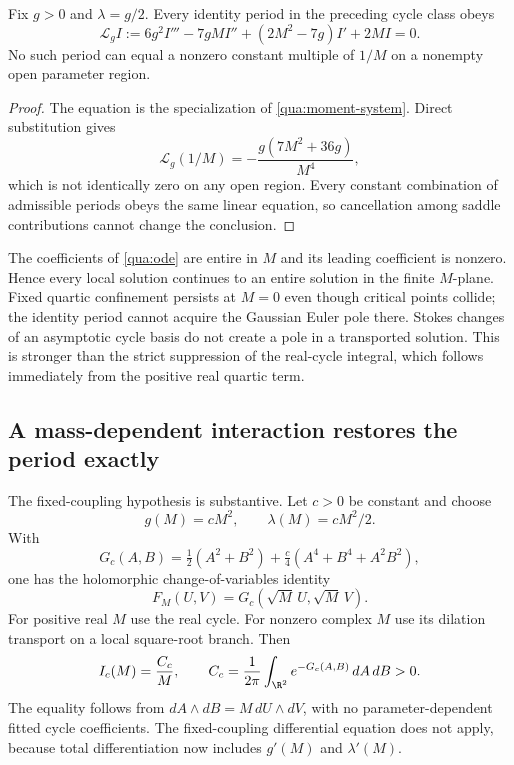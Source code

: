 \begin{theorem}\label{qua:fixed-exclusion}
Fix $g>0$ and $\lambda=g/2$. Every identity period in the preceding cycle class obeys
\begin{equation}\label{qua:ode}
\mathcal L_gI:=6g^2I'''-7gMI''+(2M^2-7g)I'+2MI=0.
\end{equation}
No such period can equal a nonzero constant multiple of $1/M$ on a nonempty open parameter region.
\end{theorem}
\begin{proof}
The equation is the specialization of \eqref{qua:moment-system}. Direct substitution gives
\begin{equation}\label{qua:residual}
\mathcal L_g(1/M)=-\frac{g(7M^2+36g)}{M^4},
\end{equation}
which is not identically zero on any open region. Every constant combination of admissible periods obeys the same linear equation, so cancellation among saddle contributions cannot change the conclusion.
\end{proof}
The coefficients of \eqref{qua:ode} are entire in $M$ and its leading coefficient is nonzero. Hence every local solution continues to an entire solution in the finite $M$-plane. Fixed quartic confinement persists at $M=0$ even though critical points collide; the identity period cannot acquire the Gaussian Euler pole there. Stokes changes of an asymptotic cycle basis do not create a pole in a transported solution. This is stronger than the strict suppression of the real-cycle integral, which follows immediately from the positive real quartic term.

\subsection{A mass-dependent interaction restores the period exactly}
The fixed-coupling hypothesis is substantive. Let $c>0$ be constant and choose
\begin{equation}\label{qua:scaled-couplings}
g(M)=cM^2,\qquad \lambda(M)=cM^2/2.
\end{equation}
With
\[
G_c(A,B)=\tfrac12(A^2+B^2)+\tfrac c4(A^4+B^4+A^2B^2),
\]
one has the holomorphic change-of-variables identity
\begin{equation}\label{qua:dilation}
F_M(U,V)=G_c(\sqrt M\,U,\sqrt M\,V).
\end{equation}
For positive real $M$ use the real cycle. For nonzero complex $M$ use its dilation transport on a local square-root branch. Then
\begin{equation}\label{qua:scaled-period}
I_c(M)=\frac{C_c}{M},\qquad
C_c=\frac1{2\pi}\int_{\R^2}e^{-G_c(A,B)}\,dA\,dB>0.
\end{equation}
The equality follows from $dA\wedge dB=M\,dU\wedge dV$, with no parameter-dependent fitted cycle coefficients. The fixed-coupling differential equation does not apply, because total differentiation now includes $g'(M)$ and $\lambda'(M)$.

